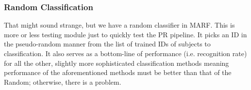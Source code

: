 \subsubsection{Random Classification}

That might sound strange, but we have a random classifier in MARF.
This is more or less testing module just to quickly test
the PR pipeline.  It picks an ID in the pseudo-random manner from the list of
trained IDs of subjects to classification.  It also serves as
a bottom-line of performance (i.e. recognition rate) for all
the other, slightly more sophisticated classification methods meaning
performance of the aforementioned methods must be better than
that of the Random; otherwise, there is a problem.
